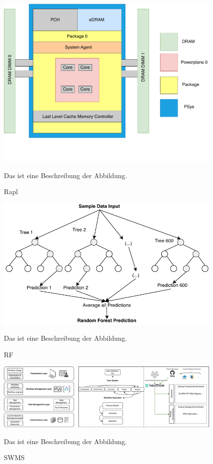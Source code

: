 \begin{figure}[H]
    \centering
    \includegraphics[scale=0.5]{fig/02/02-rapl.pdf}
    \caption{Rapl}
    \label{fig:02-rapl}
    \tiny
    Das ist eine Beschreibung der Abbildung.
\end{figure}

\begin{figure}[H]
    \centering
    \includegraphics[scale=0.7]{fig/02/02-rf.pdf}
    \caption{RF}
    \label{fig:02-rf}
    \tiny
    Das ist eine Beschreibung der Abbildung.
\end{figure}

\begin{figure}[H]
    \centering
    \includegraphics[scale=0.45]{fig/02/02-swms.pdf}
    \caption{SWMS}
    \label{fig:02-swms}
    \tiny
    Das ist eine Beschreibung der Abbildung.
\end{figure}

